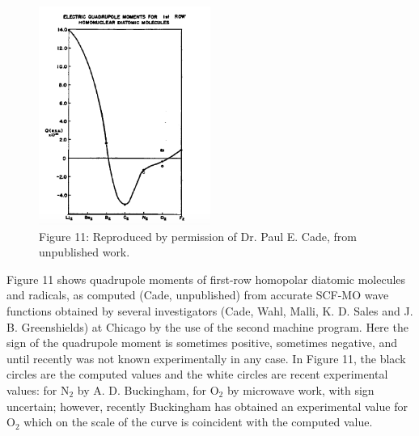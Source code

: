 \documentclass[11pt]{memoir}
\begin{document}
\begin{figure}
\begin{center}
\includegraphics[width=0.5\textwidth]{images/mulliken_figure11.png}
\end{center}
\caption*{Figure 11: Reproduced by permission of Dr. Paul E. Cade, from unpublished work.}
\end{figure}



Figure 11 shows quadrupole moments of first-row homopolar diatomic molecules and radicals, as computed (Cade, unpublished) from accurate SCF-MO wave functions obtained by several investigators (Cade, Wahl, Malli, K. D. Sales and J. B. Greenshields) at Chicago by the use of the second machine program.  Here the sign of the quadrupole moment is sometimes positive, sometimes negative, and until recently was not known experimentally in any case. In Figure 11, the black circles are the computed values and the white circles are recent experimental values: for $\mathrm{N_2}$ by A. D. Buckingham, for $\mathrm{O_2}$ by microwave work, with sign uncertain; however, recently Buckingham has obtained an experimental value for $\mathrm{O_2}$ which on the scale of the curve is coincident with the computed value.
\end{document}
